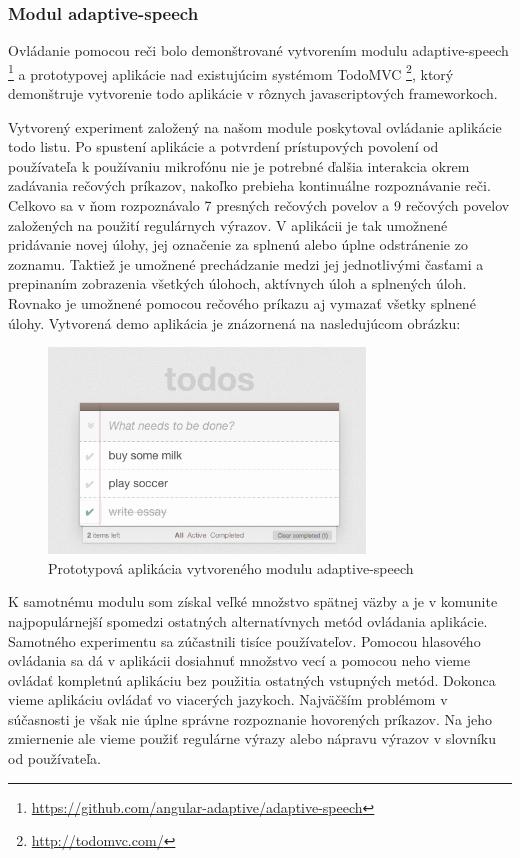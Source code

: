 \subsubsection{Modul adaptive-speech} %
\label{sub:adaptive_speech}

Ovládanie pomocou reči bolo demonštrované vytvorením modulu adaptive-speech \footnote{\url{https://github.com/angular-adaptive/adaptive-speech}} a prototypovej aplikácie nad existujúcim systémom TodoMVC \footnote{\url{http://todomvc.com/}}, ktorý demonštruje vytvorenie todo aplikácie v rôznych javascriptových frameworkoch. 

Vytvorený experiment založený na našom module poskytoval ovládanie aplikácie todo listu. Po spustení aplikácie a potvrdení prístupových povolení od používateľa k používaniu mikrofónu nie je potrebné ďalšia interakcia okrem zadávania rečových príkazov, nakoľko prebieha kontinuálne rozpoznávanie reči. Celkovo sa v ňom rozpoznávalo 7 presných rečových povelov a 9 rečových povelov založených na použití regulárnych výrazov. V aplikácii je tak umožnené pridávanie novej úlohy, jej označenie za splnenú alebo úplne odstránenie zo zoznamu. Taktiež je umožnené prechádzanie medzi jej jednotlivými časťami a prepinaním zobrazenia všetkých úlohoch, aktívnych úloh a splnených úloh. Rovnako je umožnené pomocou rečového príkazu aj vymazať všetky splnené úlohy. Vytvorená demo aplikácia je znázornená na nasledujúcom obrázku:

\begin{figure}[H]
  \centering
  \includegraphics[width=0.75\textwidth]{img/adaptivespeech.png}
  \caption[Prototypová aplikácia vytvoreného modulu adaptive-speech]{
    Prototypová aplikácia vytvoreného modulu adaptive-speech}
  \label{fig: adaptivespeech}
\end{figure}

K samotnému modulu som získal veľké množstvo spätnej väzby a je v komunite najpopulárnejší spomedzi ostatných alternatívnych metód ovládania aplikácie. Samotného experimentu sa zúčastnili tisíce používateľov. Pomocou hlasového ovládania sa dá v aplikácii dosiahnuť množstvo vecí a pomocou neho vieme ovládať kompletnú aplikáciu bez použitia ostatných vstupných metód. Dokonca vieme aplikáciu ovládať vo viacerých jazykoch. Najväčším problémom v súčasnosti je však nie úplne správne rozpoznanie hovorených príkazov. Na jeho zmiernenie ale vieme použiť regulárne výrazy alebo nápravu výrazov v slovníku od používateľa.

